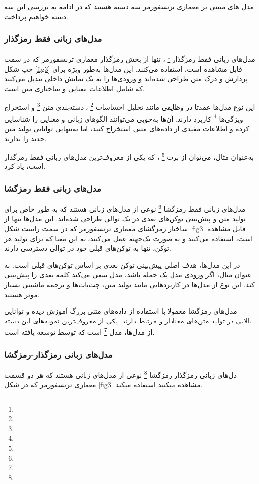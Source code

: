   مدل های مبتنی بر معماری ترنسفورمر سه دسته هستند که در ادامه به بررسی این سه دسته خواهیم پرداخت.
  
 \subsubsection{مدل‌های زبانی فقط رمزگذار}
مدل‌های زبانی فقط رمزگذار
\footnote{}
، تنها از بخش رمزگذار معماری ترنسفورمر که در سمت چپ شکل 
\ref{fig3}
 قابل مشاهده است، استفاده می‌کنند. این مدل‌ها به‌طور ویژه برای پردازش و درک متن طراحی شده‌اند و ورودی‌ها را به یک نمایش داخلی تبدیل می‌کنند که شامل اطلاعات معنایی و ساختاری متن است.

این نوع مدل‌ها عمدتا در وظایفی مانند تحلیل احساسات
 \footnote{}
، دسته‌بندی متن
 \footnote{}
 و استخراج ویژگی‌ها
 \footnote{}
  کاربرد دارند. آن‌ها به‌خوبی می‌توانند الگوهای زبانی و معنایی را شناسایی کرده و اطلاعات مفیدی از داده‌های متنی استخراج کنند، اما به‌تنهایی توانایی تولید متن جدید را ندارند.

به‌عنوان مثال، می‌توان از برت
 \footnote{}
\cite{b9}
\cite{b10}
، که یکی از معروف‌ترین مدل‌های زبانی فقط رمزگذار است، یاد کرد.
 \subsubsection{مدل‌های زبانی فقط رمزگشا}
 مدل‌های زبانی فقط رمزگشا
 \footnote{}
 نوعی از مدل‌های زبانی هستند که به طور خاص برای تولید متن و پیش‌بینی توکن‌های بعدی در یک توالی طراحی شده‌اند. این مدل‌ها تنها از ساختار رمزگشای معماری ترنسفورمر که در سمت راست شکل 
 \ref{fig3}
 قابل مشاهده است،
 استفاده می‌کنند و به صورت تک‌جهته عمل می‌کنند، به این معنا که برای تولید هر توکن، تنها به توکن‌های قبلی خود در توالی دسترسی دارند.
 
 در این مدل‌ها، هدف اصلی پیش‌بینی توکن بعدی بر اساس توکن‌های قبلی است. به عنوان مثال، اگر ورودی مدل یک جمله باشد، مدل سعی می‌کند کلمه بعدی را پیش‌بینی کند. این نوع از مدل‌ها در کاربردهایی مانند تولید متن، چت‌بات‌ها و ترجمه ماشینی بسیار موثر هستند.
 
 مدل‌های رمزگشا معمولا با استفاده از داده‌های متنی بزرگ آموزش دیده و توانایی بالایی در تولید متن‌های معنادار و مرتبط دارند. یکی از معروف‌ترین نمونه‌های این دسته از مدل‌ها، مدل
 \footnote{}
 \cite{b11}
 است که توسط
  توسعه یافته است.
  \subsubsection{مدل‌های زبانی رمزگذار-رمزگشا}
دل‌های زبانی رمزگذار-رمزگشا 
\footnote{}
نوعی از مدل‌های زبانی هستند که هر دو قسمت معماری ترنسفورمر
که در شکل 
 \ref{fig3}
 مشاهده میکنید استفاده میکند.

